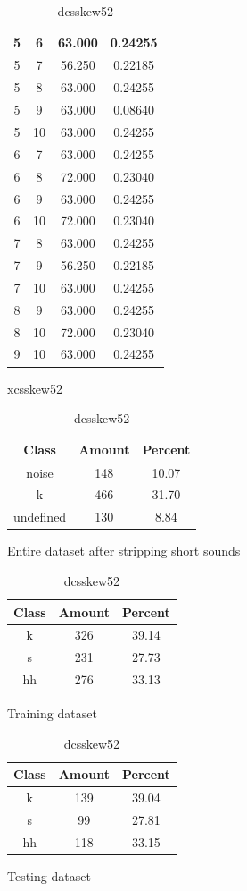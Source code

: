 \begin{table}
\begin{subtable}[tbp]{0.45\textwidth}
{\begin{tabular}{|c|c|c|c|}
 5 & 6 & 63.000 & 0.24255\\ \hline 
 5 & 7 & 56.250 & 0.22185\\ \hline 
 5 & 8 & 63.000 & 0.24255\\ \hline 
 5 & 9 & 63.000 & 0.08640\\ \hline 
 5 & 10 & 63.000 & 0.24255\\ \hline 
 6 & 7 & 63.000 & 0.24255\\ \hline 
 6 & 8 & 72.000 & 0.23040\\ \hline 
 6 & 9 & 63.000 & 0.24255\\ \hline 
 6 & 10 & 72.000 & 0.23040\\ \hline 
 7 & 8 & 63.000 & 0.24255\\ \hline 
 7 & 9 & 56.250 & 0.22185\\ \hline 
 7 & 10 & 63.000 & 0.24255\\ \hline 
 8 & 9 & 63.000 & 0.24255\\ \hline 
 8 & 10 & 72.000 & 0.23040\\ \hline 
 9 & 10 & 63.000 & 0.24255\\ \hline 

\end{tabular}
}\caption{xcsskew52} \label{xlsskew52}

\end{subtable}

\begin{subtable}[tbp]{0.45\textwidth}
\centering
\begin{tabular}{|c|c|c|}
\hline
Class & Amount & Percent\\ \hline
noise & 148 & 10.07\\ \hline
k & 466 & 31.70\\ \hline
undefined & 130 & 8.84\\ \hline
\end{tabular}
\caption{Entire dataset after stripping short sounds}
\end{subtable}
\hfill
\begin{subtable}[tbp]{0.45\textwidth}
\centering
\begin{tabular}{|c|c|c|}
\hline
Class & Amount & Percent\\ \hline
k & 326 & 39.14\\ \hline
s & 231 & 27.73\\ \hline
hh & 276 & 33.13\\ \hline
\end{tabular}
\caption{Training dataset}
\end{subtable}
\hfill
\begin{subtable}[tbp]{0.45\textwidth}
\centering
\begin{tabular}{|c|c|c|}
\hline
Class & Amount & Percent\\ \hline
k & 139 & 39.04\\ \hline
s & 99 & 27.81\\ \hline
hh & 118 & 33.15\\ \hline
\end{tabular}
\caption{Testing dataset}
\end{subtable}
\hfill

\caption{dcsskew52}
\label{dlsskew52}


\end{table}\clearpage
